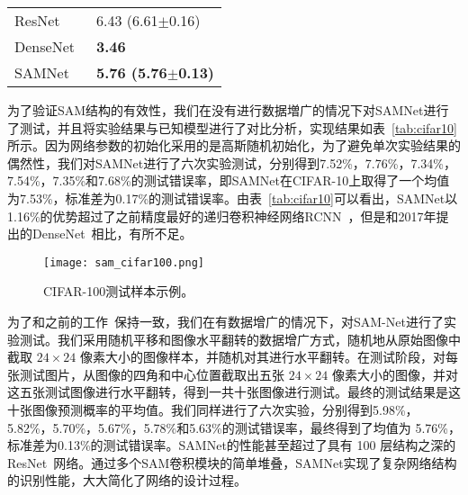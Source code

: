 \begin{table}[h]
\begin{minipage}[t]{0.8\textwidth}
\begin{tabularx}{\linewidth}{L{6cm}C{4cm}}
ResNet~\cite{he2015deep} & 6.43 (6.61$\pm$0.16) \\
DenseNet~\cite{huang2016densely} & \bf{3.46} \\
\hline
SAMNet & \bf{5.76 (5.76$\pm$0.13)} \\
 \bottomrule[1.5pt]
 \end{tabularx}
\end{minipage}
\end{table}


为了验证SAM结构的有效性，我们在没有进行数据増广的情况下对SAMNet进行了测试，并且将实验结果与已知模型进行了对比分析，实现结果如表~\ref{tab:cifar10}所示。因为网络参数的初始化采用的是高斯随机初始化，为了避免单次实验结果的偶然性，我们对SAMNet进行了六次实验测试，分别得到7.52\%，7.76\%，7.34\%，7.54\%，7.35\%和7.68\%的测试错误率，即SAMNet在CIFAR-10上取得了一个均值为7.53\%，标准差为0.17\%的测试错误率。由表~\ref{tab:cifar10}可以看出，SAMNet以1.16\%的优势超过了之前精度最好的递归卷积神经网络RCNN~\cite{liang2015recurrent}，但是和2017年提出的DenseNet~\cite{huang2016densely}相比，有所不足。

\begin{figure}[!h]
\centering
\texttt{[image: sam\_cifar100.png]}
\caption{CIFAR-100测试样本示例。}
\label{fig:sam_cifar100}
\end{figure}


为了和之前的工作~\cite{goodfellow2013maxout,springenberg2013improving,stollenga2014deep,wan2013regularization,DBLP:journals/corr/LinCY13,lee2014deeply,liang2015recurrent,srivastava2015training,springenberg2014striving}保持一致，我们在有数据增广的情况下，对SAM-Net进行了实验测试。我们采用随机平移和图像水平翻转的数据增广方式，随机地从原始图像中截取 $24\times24$ 像素大小的图像样本，并随机对其进行水平翻转。在测试阶段，对每张测试图片，从图像的四角和中心位置截取出五张 $24\times24$ 像素大小的图像，并对这五张测试图像进行水平翻转，得到一共十张图像进行测试。最终的测试结果是这十张图像预测概率的平均值。我们同样进行了六次实验，分别得到5.98\%，5.82\%，5.70\%，5.67\%，5.78\%和5.63\%的测试错误率，最终得到了均值为 5.76\%，标准差为0.13\%的测试错误率。SAMNet的性能甚至超过了具有 100 层结构之深的ResNet~\cite{he2015deep}网络。通过多个SAM卷积模块的简单堆叠，SAMNet实现了复杂网络结构的识别性能，大大简化了网络的设计过程。



